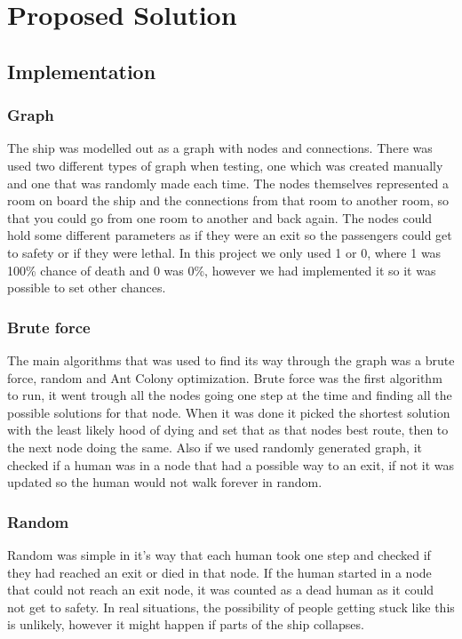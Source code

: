 \chapter{Proposed Solution}
\label{ch:solution}


\section{Implementation}

\subsection{Graph}
The ship was modelled out as a graph with nodes and connections. There was used two different types of graph when testing, one which was created manually and one that was randomly made each time. The nodes themselves represented a room on board the ship and the connections from that room to another room, so that you could go from one room to another and back again. The nodes could hold some different parameters as if they were an exit so the passengers could get to safety or if they were lethal. In this project we only used 1 or 0, where 1 was 100\% chance of death and 0 was 0\%, however we had implemented it so it was possible to set other chances.

\subsection{Brute force}
The main algorithms that was used to find its way through the graph was a brute force, random and Ant Colony optimization. Brute force was the first algorithm to run, it went trough all the nodes going one step at the time and finding all the possible solutions for that node. When it was done it picked the shortest solution with the least likely hood of dying and set that as that nodes best route, then to the next node doing the same. Also if we used randomly generated graph, it checked if a human was in a node that had a possible way to an exit, if not it was updated so the human would not walk forever in random. 

\subsection{Random}
Random was simple in it's way that each human took one step and checked if they had reached an exit or died in that node. If the human started in a node that could not reach an exit node, it was counted as a dead human as it could not get to safety. In real situations, the possibility of people getting stuck like this is unlikely, however it might happen if parts of the ship collapses.

